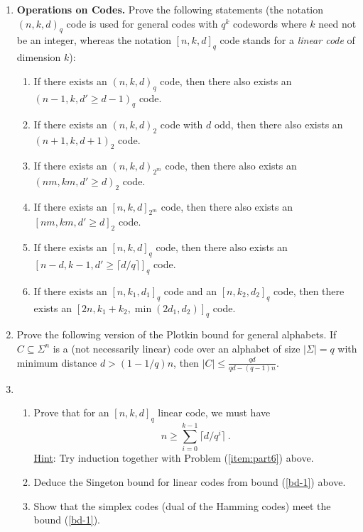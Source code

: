 \documentclass[11pt]{article}
\begin{document}
\begin{enumerate}
\item {\bf Operations on Codes.} Prove the following statements (the
  notation $(n,k,d)_q$ code is used for general codes with $q^k$
  codewords where $k$ need not be an integer, whereas the notation
  $[n,k,d]_q$ code stands for a {\em linear code} of dimension $k$):
\begin{enumerate}
\item If there exists an $(n,k,d)_q$ code, then there also exists an $(n-1,k,d' \ge d-1)_q$ code. 
\item If there exists an $(n,k,d)_2$ code with $d$ odd, then there also exists an $(n+1,k,d+1)_2$ code.
\item If there exists an $(n,k,d)_{2^m}$ code, then there also exists an $(nm,km,d' \ge d)_2$ code.
\item If there exists an $[n,k,d]_{2^m}$ code, then there also exists an $[nm,km,d' \ge d]_2$ code.  
\item \label{item:part6} If there exists an $[n,k,d]_{q}$ code, then there also exists an $[n-d, k-1, d' \ge \lceil d/q \rceil]_q$ code.
\item If there exists an $[n,k_1,d_1]_q$ code and an $[n,k_2,d_2]_q$ code, then there exists an $[2n,k_1+k_2,\min (2d_1,d_2)]_q$ code.

\end{enumerate}


\item Prove the following version of the Plotkin bound for general alphabets. If $C \subseteq \Sigma^n$ is a (not necessarily linear) code over an alphabet of size $|\Sigma| =q$ with minimum distance $d > (1-1/q) n$, then $|C| \le \frac{qd}{qd-(q-1) n}$. 

\item 
\begin{enumerate}
\item Prove that for an $[n,k,d]_q$ linear code, we must have
\begin{equation}
\label{bd-1}
n \ge \sum_{i=0}^{k-1} \lceil d/q^i \rceil \ . 
\end{equation}
\underline{Hint}: Try induction together with Problem (\ref{item:part6})
above.
\item Deduce the Singeton bound for linear codes from bound (\ref{bd-1}) above.
\item Show that the simplex codes (dual of the Hamming codes) meet the bound (\ref{bd-1}). 
\end{enumerate}


\end{enumerate}
\end{document}
